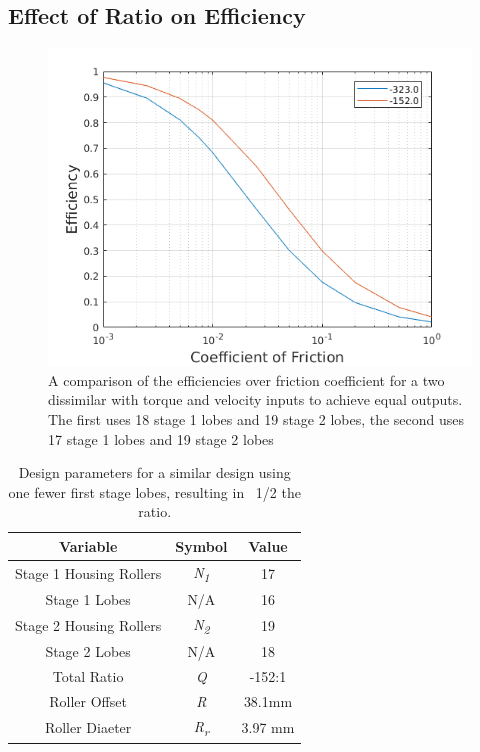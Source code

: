 \subsection{Effect of Ratio on Efficiency} \label{ch:dual:discussion:ratio}

\begin{figure}[h]
	\centering
	\includegraphics[width=0.75\linewidth]{fig/two_stage_lower_ratio}
   \caption{A comparison of the efficiencies over friction coefficient for a two dissimilar with torque and velocity inputs to achieve equal outputs. The first uses 18 stage 1 lobes and 19 stage 2 lobes, the second uses 17 stage 1 lobes and 19 stage 2 lobes}
   \label{fig:two_stage_lower_ratio}
\end{figure}


\begin{table}[h]
  \vskip0.2cm
  \caption{Design parameters for a similar design using one fewer first stage lobes, resulting in ~1/2 the ratio.}
  \label{table:two_stage_lower_ratio}
  \begin{center}
    \vskip-0.2cm
	\begin{tabular}{|c|c|c|}
		\hline
		Variable & Symbol & Value\\
		\hline
		Stage 1 Housing Rollers & \textit{N\textsubscript{1}} & 17\\
		\hline
		Stage 1 Lobes & N/A & 16\\
		\hline
		Stage 2 Housing Rollers & \textit{N\textsubscript{2}} & 19\\
		\hline
		Stage 2 Lobes & N/A & 18\\
		\hline
		Total Ratio & \textit{Q} & -152:1 \\
		\hline
		Roller Offset & \textit{R} & 38.1mm \\
		\hline
		Roller Diaeter & \textit{R\textsubscript{r}} & 3.97 mm\\
		\hline
	\end{tabular}
  \end{center}
\end{table}

